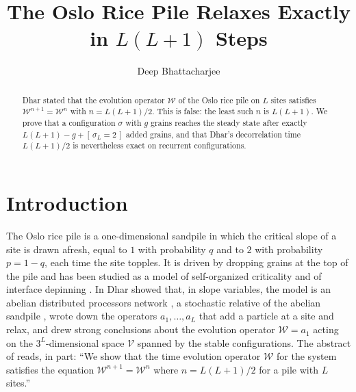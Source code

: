 \documentclass[11pt]{amsart}
\theoremstyle{definition}
\theoremstyle{remark}
\newcommand{\cV}{\mathcal{V}}
\newcommand{\cW}{\mathcal{W}}
\newcommand{\Ind}[1]{[\,#1\,]}
\begin{document}
\title{The Oslo Rice Pile Relaxes Exactly in $L(L+1)$ Steps}

\author{Deep Bhattacharjee}
\address{Formerly, Electro-Gravitational Space Propulsion Laboratory (EGSPL), Bhubaneswar, Odisha 751030, India}
\address{Formerly, University of Calcutta (Heramba Chandra College), 23/49 Gariahat Road, Golpark, Kolkata 700029, West Bengal, India}


\begin{abstract}
Dhar stated that the evolution operator $\cW$ of the Oslo rice pile on $L$ sites satisfies $\cW^{n+1}=\cW^n$ with $n=L(L+1)/2$. This is false: the least such $n$ is $L(L+1)$. We prove that a configuration $\sigma$ with $g$ grains reaches the steady state after exactly $L(L+1)-g+\Ind{\sigma_L=2}$ added grains, and that Dhar's decorrelation time $L(L+1)/2$ is nevertheless exact on recurrent configurations.
\end{abstract}

\maketitle

\section{Introduction}

The Oslo rice pile \cite{CCFFJ96,FCMFJM96} is a one-dimensional sandpile in which the critical slope of a site is drawn afresh, equal to $1$ with probability $q$ and to $2$ with probability $p=1-q$, each time the site topples. It is driven by dropping grains at the top of the pile and has been studied as a model of self-organized criticality \cite{BTW87,Pru12} and of interface depinning \cite{PB96,Pru03,GDM16}. In \cite{Dha04} Dhar showed that, in slope variables, the model is an abelian distributed processors network \cite{Dha99}, a stochastic relative of the abelian sandpile \cite{Dha90}, wrote down the operators $a_1,\dots,a_L$ that add a particle at a site and relax, and drew strong conclusions about the evolution operator $\cW=a_1$ acting on the $3^L$-dimensional space $\cV$ spanned by the stable configurations. The abstract of \cite{Dha04} reads, in part: ``We show that the time evolution operator $\cW$ for the system satisfies the equation $\cW^{n+1}=\cW^n$ where $n=L(L+1)/2$ for a pile with $L$ sites.''
\end{document}
